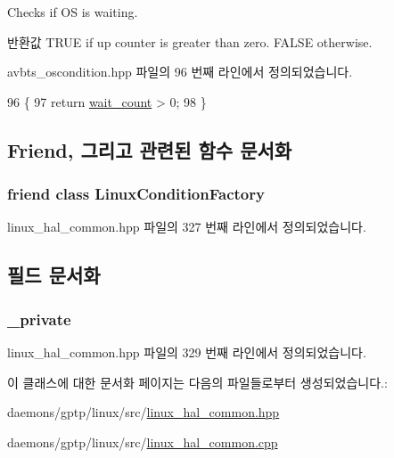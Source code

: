 Checks if OS is waiting. 

\begin{DoxyReturn}{반환값}
T\+R\+UE if up counter is greater than zero. F\+A\+L\+SE otherwise. 
\end{DoxyReturn}


avbts\+\_\+oscondition.\+hpp 파일의 96 번째 라인에서 정의되었습니다.


\begin{DoxyCode}
96                    \{
97         \textcolor{keywordflow}{return} \hyperlink{class_o_s_condition_a3f608c86f5674663aa19921c25cce926}{wait\_count} > 0;
98     \}
\end{DoxyCode}


\subsection{Friend, 그리고 관련된 함수 문서화}
\subsubsection[{\texorpdfstring{Linux\+Condition\+Factory}{LinuxConditionFactory}}]{\setlength{\rightskip}{0pt plus 5cm}friend class {\bf Linux\+Condition\+Factory}\hspace{0.3cm}{\ttfamily [friend]}}\hypertarget{class_linux_condition_a0e86a85a05713b069c8c32aae1221ee5}{}\label{class_linux_condition_a0e86a85a05713b069c8c32aae1221ee5}


linux\+\_\+hal\+\_\+common.\+hpp 파일의 327 번째 라인에서 정의되었습니다.



\subsection{필드 문서화}
\subsubsection[{\texorpdfstring{\+\_\+private}{_private}}]{ \+\_\+private\hspace{0.3cm}{\ttfamily [private]}}\hypertarget{class_linux_condition_a3d5dfb7072495e32222b0bd0ac3975bb}{}\label{class_linux_condition_a3d5dfb7072495e32222b0bd0ac3975bb}


linux\+\_\+hal\+\_\+common.\+hpp 파일의 329 번째 라인에서 정의되었습니다.



이 클래스에 대한 문서화 페이지는 다음의 파일들로부터 생성되었습니다.\+:\begin{DoxyCompactItemize}
\item 
daemons/gptp/linux/src/\hyperlink{linux__hal__common_8hpp}{linux\+\_\+hal\+\_\+common.\+hpp}\item 
daemons/gptp/linux/src/\hyperlink{linux__hal__common_8cpp}{linux\+\_\+hal\+\_\+common.\+cpp}\end{DoxyCompactItemize}
